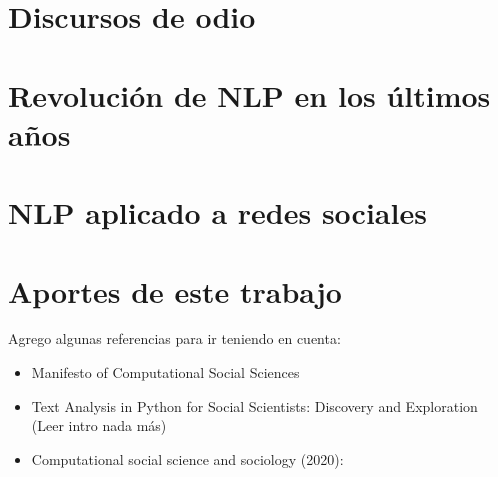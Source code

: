 
\section{Discursos de odio}

\section{Revolución de NLP en los últimos años}
\section{NLP aplicado a redes sociales}

\section{Aportes de este trabajo}

Agrego algunas referencias para ir teniendo en cuenta:

\begin{itemize}
    \item Manifesto of Computational Social Sciences \cite{conte2012manifesto}
    \item Text Analysis in Python for Social Scientists: Discovery and Exploration \cite{hovy2020text} (Leer intro nada más)
    \item Computational social science and sociology (2020): \cite{edelmann2020computational}
\end{itemize}